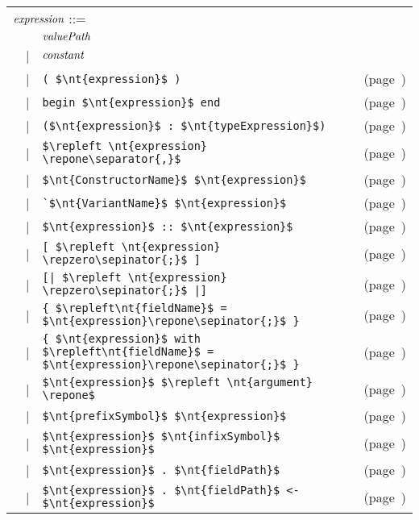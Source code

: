 \begin{center}
\begin{tabular}{rcll}
\multicolumn{3}{l}{$\textit{\rmfamily expression}$ ::=}\\
& & $\textit{\rmfamily valuePath}$\\
& | & $\textit{\rmfamily constant}$\\
& | & \hbox{\lstinline/( $\nt{expression}$ )/} & (page~\pageref{keyword:begin})\\
& | & \hbox{\lstinline/begin $\nt{expression}$ end/} & (page~\pageref{keyword:begin})\\
& | & \hbox{\lstinline/($\nt{expression}$ : $\nt{typeExpression}$)/} & (page~\pageref{keyword::})\\
& | & \hbox{\lstinline/$\repleft \nt{expression} \repone\separator{,}$/} & (page~\pageref{keyword:,})\\
& | & \hbox{\lstinline/$\nt{ConstructorName}$ $\nt{expression}$/} & (page~\pageref{chapter:unions})\\
& | & \hbox{\lstinline/`$\nt{VariantName}$ $\nt{expression}$/} & (page~\pageref{keyword:polymorphic-variants})\\
& | & \hbox{\lstinline/$\nt{expression}$ :: $\nt{expression}$/} & (page~\pageref{keyword:::})\\
& | & \hbox{\lstinline/[ $\repleft \nt{expression} \repzero\sepinator{;}$ ]/} & (page~\pageref{keyword:lists})\\
& | & \hbox{\lstinline/[| $\repleft \nt{expression} \repzero\sepinator{;}$ |]/} & (page~\pageref{keyword:arrays})\\
& | & \hbox{\lstinline/{ $\repleft\nt{fieldName}$ = $\nt{expression}\repone\sepinator{;}$ }/} & (page~\pageref{keyword:records})\\
& | & \hbox{\lstinline/{ $\nt{expression}$ with $\repleft\nt{fieldName}$ = $\nt{expression}\repone\sepinator{;}$ }/} & (page~\pageref{records:record-update})\\
& | & \hbox{\lstinline/$\nt{expression}$ $\repleft \nt{argument} \repone$/} & (page~\pageref{application})\\
& | & \hbox{\lstinline/$\nt{prefixSymbol}$ $\nt{expression}$/} & (page~\pageref{keyword:-})\\
& | & \hbox{\lstinline/$\nt{expression}$ $\nt{infixSymbol}$ $\nt{expression}$/} & (page~\pageref{keyword:+})\\
& | & \hbox{\lstinline/$\nt{expression}$ . $\nt{fieldPath}$/} & (page~\pageref{keyword:.})\\
& | & \hbox{\lstinline/$\nt{expression}$ . $\nt{fieldPath}$ <- $\nt{expression}$/} & (page~\pageref{keyword:<-(record-field-assignment)})\\

\end{tabular}
\end{center}
